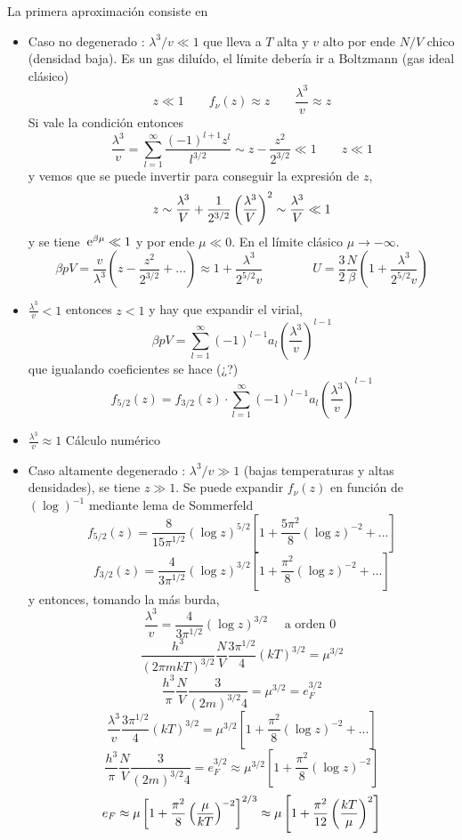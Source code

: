 \documentclass[10pt,oneside]{CBFT_book}
\begin{document}
La primera aproximación consiste en 
\begin{itemize}
 \item Caso no degenerado : $ \lambda^3 / v  \ll 1 $  que lleva a $ T $ alta y $ v $ alto
 por ende $ N/V $ chico (densidad baja).
 Es un gas diluído, el límite debería ir a Boltzmann (gas ideal clásico)
 \[	
	z \ll 1 \qquad f_\nu(z) \approx z \qquad \frac{\lambda^3}{v} \approx z
 \]
 Si vale la condición entonces 
 \[
	\frac{\lambda^3}{v} = \sum_{l=1}^\infty \frac{(-1)^{l+1} z^l }{l^{3/2}} 
	\sim z - \frac{z^2}{2^{3/2}} \ll 1 \qquad z \ll 1
 \]
 y vemos que se puede invertir para conseguir la expresión de $z$,
 \[
	z \sim \frac{\lambda^3}{V} + \frac{1}{2^{3/2}} \left( \frac{ \lambda^3 }{ V } \right)^2 \sim \frac{\lambda^3}{V} \ll 1
 \]
 y se tiene $ \:\mathrm{e}^{\beta \mu} \ll 1$ y por ende $\mu \ll 0$. En el límite clásico $\mu \to -\infty$.
 \[
	\beta p V = \frac{v}{\lambda^3}\left( z - \frac{z^2}{2^{3/2}} + ... \right) \approx 
	1 + \frac{\lambda^3}{2^{5/2} v} \qquad \qquad 
	U = \frac{3}{2} \frac{N}{\beta}
	\left( 1 + \frac{\lambda^3}{2^{5/2} v} \right)
 \]
 \item $\frac{\lambda^3}{v} < 1 $ entonces $ z < 1 $ y hay que expandir el virial,
 \[
	\beta p V = \sum_{l=1}^\infty (-1)^{l-1} a_l \left(\frac{\lambda^3}{v} \right)^{l-1}
 \]
 que igualando coeficientes se hace (¿?)
 \[
	f_{5/2}(z) = f_{3/2}(z) \cdot \sum_{l=1}^\infty (-1)^{l-1} a_l \left(\frac{\lambda^3}{v} \right)^{l-1}
 \]
 \item $\frac{\lambda^3}{v} \approx 1 $ Cálculo numérico
 \item Caso altamente degenerado : $ \lambda^3 / v \gg 1 $ (bajas temperaturas y altas
 densidades), se tiene $ z \gg 1 $. 
 Se puede expandir $ f_\nu(z) $ en función de $ (\log )^{-1} $ mediante lema de Sommerfeld
 \[
	f_{5/2}(z) = \frac{8}{15\pi^{1/2}} (\log z)^{5/2} \left[ 1 + \frac{5\pi^2}{8}(\log z)^{-2} + ... \right]
 \]
 \[
	f_{3/2}(z) = \frac{4}{3\pi^{1/2}} (\log z)^{3/2} \left[ 1 + \frac{\pi^2}{8}(\log z)^{-2} + ... \right]
 \]
 y entonces, tomando la más burda,
 \[
	\frac{\lambda^3}{v} = \frac{4}{3\pi^{1/2}} (\log z)^{3/2}  \quad \text{ a orden 0 }
 \]
 \[
	\frac{h^3}{ (2\pi mkT)^{3/2} } \frac{N}{V} \frac{3\pi^{1/2}}{4} (kT)^{3/2} = \mu^{ 3/2 }
 \]
 \[
	\frac{ h^3 }{ \pi } \frac{ N }{ V } \frac{ 3 }{ ( 2m )^{ 3/2 } 4 } = \mu^{ 3/2 } = e_F^{3/2}
 \]
 \[
	\frac{\lambda^3}{v}\frac{3\pi^{1/2}}{4} (kT)^{3/2} = 
	\mu^{3/2}\left[ 1 + \frac{\pi^2}{8}(\log z)^{-2} + ... \right]
 \]
 \[
	\frac{ h^3 }{ \pi } \frac{ N }{ V } \frac{ 3 }{ ( 2m )^{ 3/2 } 4 } = e_F^{3/2} \approx
	\mu^{3/2} \left[ 1 + \frac{\pi^2}{8}(\log z)^{-2} \right]
 \]
 \[
	e_F \approx \mu \left[ 1 + \frac{\pi^2}{8} \left( \frac{  \mu  }{  kT  } \right)^{-2} \right]^{ 2/3 } \approx 
	\mu \left[ 1 + \frac{\pi^2}{12} \left( \frac{  kT  }{  \mu  } \right)^{2} \right]
 \]
 

\end{itemize}
\end{document}
